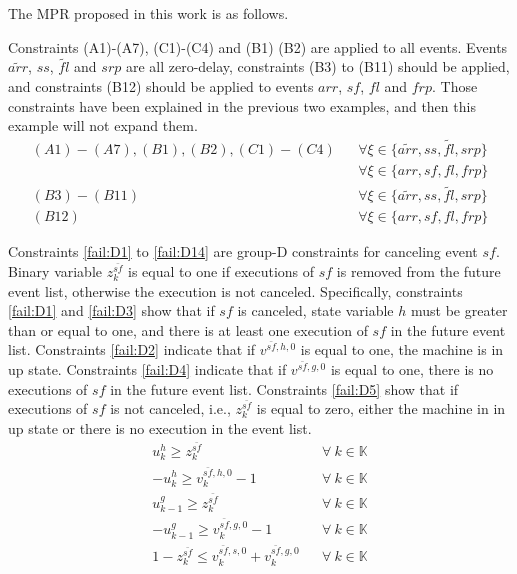 \documentclass[]{interact}
\theoremstyle{plain}%
\theoremstyle{definition}
\theoremstyle{remark}
\begin{document}
The MPR proposed in this work is as follows.

Constraints (A1)-(A7), (C1)-(C4) and (B1) (B2) are applied to all events. Events ${\tilde{arr}}$, ${ss}$, ${\tilde{fl}}$ and ${srp}$ are all zero-delay, constraints (B3) to (B11) should be applied, and constraints (B12) should be applied to events ${arr}$, ${sf}$, ${fl}$ and ${frp}$. Those constraints have been explained in the previous two examples, and then this example will not expand them. 
\begin{eqnarray}
(A1)-(A7),(B1),(B2),(C1)-(C4)&& \forall \xi \in\{\tilde{arr},ss,\tilde{fl},srp\}\nonumber\\
&&  \forall\xi \in\{arr,sf,fl,frp\}\nonumber\\
(B3)-(B11)&& \forall \xi \in\{\tilde{arr},ss,\tilde{fl},srp\}\nonumber\\
(B12)&& \forall\xi \in\{arr,sf,fl,frp\}\nonumber
\end{eqnarray}

Constraints \eqref{fail:D1} to \eqref{fail:D14} are group-D constraints for canceling event ${sf}$. Binary variable $z^{\bar{sf}}_k$ is equal to one if executions of ${sf}$ is removed from the future event list, otherwise the execution is not canceled. Specifically, constraints \eqref{fail:D1} and \eqref{fail:D3} show that if ${sf}$ is canceled, state variable $h$ must be greater than or equal to one, and there is at least one execution of $sf$ in the future event list. Constraints \eqref{fail:D2} indicate that if $v^{\bar{sf},h,0}$ is equal to one, the machine is in up state. Constraints \eqref{fail:D4} indicate that if $v^{\bar{sf},g,0}$ is equal to one, there is no executions of ${sf}$ in the future event list. Constraints \eqref{fail:D5} show that if executions of ${sf}$ is not canceled, i.e., $z^{\bar{sf}}_k$ is equal to zero, either the machine in in up state or there is no execution in the event list. 
\begin{eqnarray}
u^{h}_k\ge z^{\bar{sf}}_k&&\forall\ k\in \mathbb{K}\label{fail:D1}\\
-u^{h}_k\ge v^{\bar{sf},h,0}_k-1&&\forall\ k\in \mathbb{K}\label{fail:D2}\\
u^{g}_{k-1}\ge z^{\bar{sf}}_k &&\forall\ k\in \mathbb{K}\label{fail:D3}\\
-u^{g}_{k-1} \ge v^{\bar{sf},g,0}_k-1&&\forall\ k\in \mathbb{K}\label{fail:D4}\\
1-z^{\bar{sf}}_k\le v^{\bar{sf},s,0}_k+v^{\bar{sf},g,0}_k&&\forall\ k\in \mathbb{K}\label{fail:D5}
\end{eqnarray}
\end{document}
